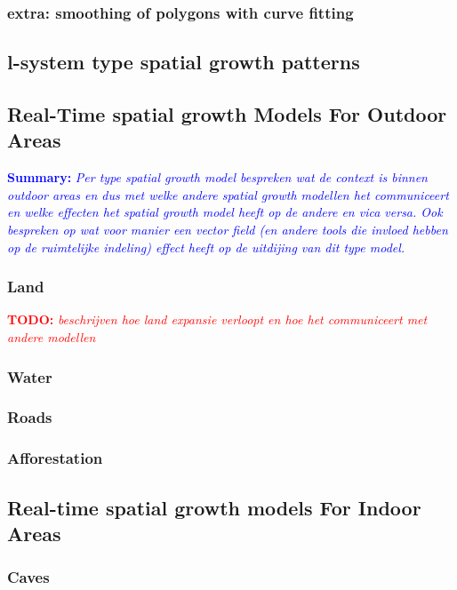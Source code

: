 \documentclass{article}
\newcommand{\todo}[1]{\textcolor{red}{\textbf{TODO: }\it{#1}}}
\newcommand{\inhoud}[1]{\textcolor{blue}{\textbf{Summary: }\it{#1}}}
\begin{document}
\subsubsection{extra: smoothing of polygons with curve fitting}


\subsection{l-system type spatial growth patterns}

\subsection{Real-Time spatial growth Models For Outdoor Areas}
\inhoud{Per type spatial growth model bespreken wat de context is binnen outdoor areas en dus met 
welke andere spatial growth modellen het communiceert en welke effecten het spatial growth model heeft 
op de andere en vica versa. Ook bespreken op wat voor manier een vector field (en andere tools 
die invloed hebben op de ruimtelijke indeling)  effect heeft op de uitdijing van dit type model.   
}

\subsubsection{Land} 
\todo{beschrijven hoe land expansie verloopt en hoe het communiceert met andere modellen}


\subsubsection{Water} 

\subsubsection{Roads}

\subsubsection{Afforestation} 

\subsection{Real-time spatial growth models For Indoor Areas}

\subsubsection{Caves}
\end{document}
